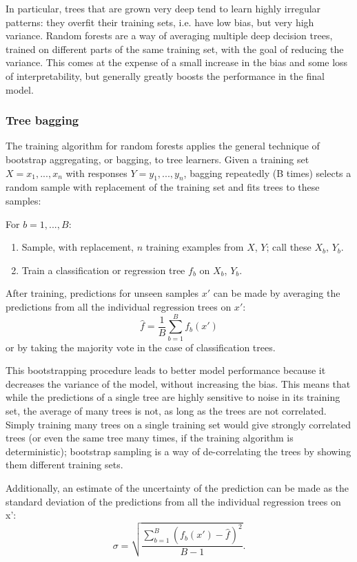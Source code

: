 \documentclass[document.tex]{subfiles}
\begin{document}
In particular, trees that are grown very deep tend to learn highly irregular patterns: they overfit their training sets, i.e. have low bias, but very high variance. Random forests are a way of averaging multiple deep decision trees, trained on different parts of the same training set, with the goal of reducing the variance. This comes at the expense of a small increase in the bias and some loss of interpretability, but generally greatly boosts the performance in the final model.

\subsubsection{Tree bagging}
The training algorithm for random forests applies the general technique of bootstrap aggregating, or bagging, to tree learners. Given a training set $X = x_1, ..., x_n$ with responses $Y = y_1, ..., y_n$, bagging repeatedly (B times) selects a random sample with replacement of the training set and fits trees to these samples:

For $b = 1, ..., B:$
\begin{enumerate}
	\item Sample, with replacement, $n$ training examples from $X$, $Y$; call these $X_b$, $Y_b$.
	\item Train a classification or regression tree $f_b$ on $X_b$, $Y_b$.
\end{enumerate}

After training, predictions for unseen samples $x'$ can be made by averaging the predictions from all the individual regression trees on $x'$:
\begin{equation}
{\displaystyle {\hat {f}}={\frac {1}{B}}\sum _{b=1}^{B}f_{b}(x')} 
\end{equation}
or by taking the majority vote in the case of classification trees.

This bootstrapping procedure leads to better model performance because it decreases the variance of the model, without increasing the bias. This means that while the predictions of a single tree are highly sensitive to noise in its training set, the average of many trees is not, as long as the trees are not correlated. Simply training many trees on a single training set would give strongly correlated trees (or even the same tree many times, if the training algorithm is deterministic); bootstrap sampling is a way of de-correlating the trees by showing them different training sets.

Additionally, an estimate of the uncertainty of the prediction can be made as the standard deviation of the predictions from all the individual regression trees on x':
\begin{equation}
{\displaystyle \sigma ={\sqrt {\frac {\sum _{b=1}^{B}(f_{b}(x')-{\hat {f}})^{2}}{B-1}}}.}
\end{equation}
\end{document}
